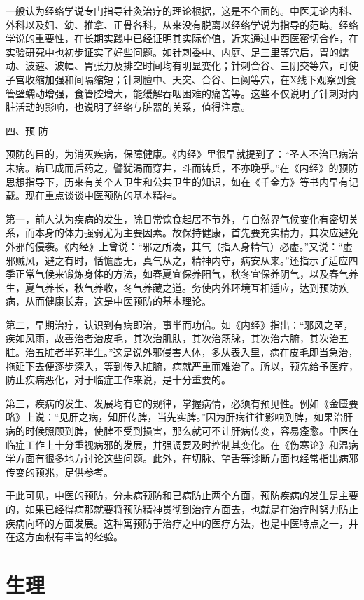 \documentclass[12pt,UTF8]{ctexbook}
\begin{document}
一般认为经络学说专门指导针灸治疗的理论根据，这是不全面的。中医无论内科、外科以及妇、幼、推拿、正骨各科，从来没有脱离以经络学说为指导的范畴。经络学说的重要性，在长期实践中已经证明其实际价值，近来通过中西医密切合作，在实验研究中也初步证实了好些问题。如针刺委中、内庭、足三里等穴后，胃的蠕动、波速、波幅、胃张力及排空时间均有明显变化；针刺合谷、三阴交等穴，可使子宫收缩加强和间隔缩短；针刺膻中、天突、合谷、巨阙等穴，在X线下观察到食管壁蠕动增强，食管腔增大，能缓解吞咽困难的痛苦等。这些不仅说明了针刺对内脏活动的影响，也说明了经络与脏器的关系，值得注意。

四、预 防

预防的目的，为消灭疾病，保障健康。《内经》里很早就提到了：“圣人不治已病治未病。病已成而后药之，譬犹渴而穿井，斗而铸兵，不亦晚乎。”在《内经》的预防思想指导下，历来有关个人卫生和公共卫生的知识，如在《千金方》等书内早有记载。现在重点谈谈中医预防的基本精神。

第一，前人认为疾病的发生，除日常饮食起居不节外，与自然界气候变化有密切关系，而本身的体力强弱尤为主要因素。故保持健康，首先要充实精力，其次应避免外邪的侵袭。《内经》上曾说：“邪之所凑，其气（指人身精气）必虚。”又说：“虚邪贼风，避之有时，恬憺虚无，真气从之，精神内守，病安从来。”还指示了适应四季正常气候来锻炼身体的方法，如春夏宜保养阳气，秋冬宜保养阴气，以及春气养生，夏气养长，秋气养收，冬气养藏之道。务使内外环境互相适应，达到预防疾病，从而健康长寿，这是中医预防的基本理论。

第二，早期治疗，认识到有病即治，事半而功倍。如《内经》指出：“邪风之至，疾如风雨，故善治者治皮毛，其次治肌肤，其次治筋脉，其次治六腑，其次治五脏。治五脏者半死半生。”这是说外邪侵害人体，多从表入里，病在皮毛即当急治，拖延下去便逐步深入，等到传入脏腑，病就严重而难治了。所以，预先给予医疗，防止疾病恶化，对于临症工作来说，是十分重要的。

第三，疾病的发生、发展均有它的规律，掌握病情，必须有预见性。例如《金匮要略》上说：“见肝之病，知肝传脾，当先实脾。”因为肝病往往影响到脾，如果治肝病的时候照顾到脾，使脾不受到损害，那么就可不让肝病传变，容易痊愈。中医在临症工作上十分重视病邪的发展，并强调要及时控制其变化。在《伤寒论》和温病学方面有很多地方讨论这些问题。此外，在切脉、望舌等诊断方面也经常指出病邪传变的预兆，足供参考。

于此可见，中医的预防，分未病预防和已病防止两个方面，预防疾病的发生是主要的，如果已经得病那就要将预防精神贯彻到治疗方面去，也就是在治疗时努力防止疾病向坏的方面发展。这种寓预防于治疗之中的医疗方法，也是中医特点之一，并在这方面积有丰富的经验。

\section{生理}
\end{document}
